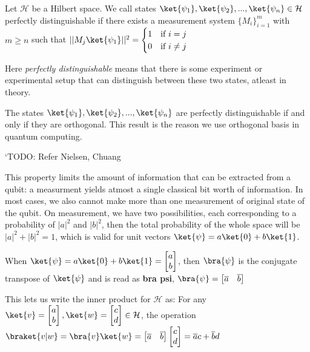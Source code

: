 \begin{defn}
    Let $\mathcal{H}$ be a Hilbert space. We call states $\ket{\psi_1}, \ket{\psi_2}, ..., \ket{\psi_n} \in \mathcal{H}$ perfectly distinguishable if there exists a measurement system $\{ M_i \}_{i=1}^m$ with $m \geq n$ such that $|| M_j \ket{\psi_1} ||^2 = \begin{cases} 1 & \text{if } i = j \\ 0 & \text{if } i \neq j \end{cases}$ 
\end{defn}
Here \textit{perfectly distinguishable} means that there is some experiment or experimental setup that can distinguish between these two states, atleast in theory.
\begin{result}
    The states $\ket{\psi_1}, \ket{\psi_2}, ..., \ket{\psi_n}$ are perfectly distinguishable if and only if they are orthogonal. This result is the reason we use orthogonal basis in quantum computing.
\end{result}
`TODO: Refer Nielsen, Chuang


This property limits the amount of information that can be extracted from a qubit: a measurment yields atmost a single classical bit worth of information. In most cases, we also cannot make more than one measurement of original state of the qubit. On measurement, we have two possibilities, each corresponding to a probability of $|a|^2$ and $|b|^2$, then the total probability of the whole space will be $|a|^2 + |b|^2 = 1$, which is valid for unit vectors $\ket{\psi} = a \ket{0} + b \ket{1}$.

\begin{notation}
    When $\ket{\psi} = a \ket{0} + b \ket{1} = \begin{bmatrix} a \\ b \end{bmatrix}$, then $\bra{\psi}$ is the conjugate transpose of $\ket{\psi}$ and is read as \textbf{bra psi}, $\bra{\psi} = \begin{bmatrix} \overline{a} & \overline{b}\end{bmatrix}$
\end{notation}

This lets us write the inner product for $\mathcal{H}$ as:
For any $\ket{v} = \begin{bmatrix} a \\ b \end{bmatrix}, \ket{w} = \begin{bmatrix} c \\ d \end{bmatrix} \in \mathcal{H}$, the operation $\braket{v|w} = \bra{v}\ket{w} = \begin{bmatrix} \overline{a} & \overline{b} \end{bmatrix} \begin{bmatrix} c \\ d \end{bmatrix} = \overline{a} c + \overline{b} d $

